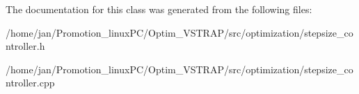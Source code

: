 The documentation for this class was generated from the following files\+:\begin{DoxyCompactItemize}
\item 
/home/jan/\+Promotion\+\_\+linux\+P\+C/\+Optim\+\_\+\+V\+S\+T\+R\+A\+P/src/optimization/stepsize\+\_\+controller.\+h\item 
/home/jan/\+Promotion\+\_\+linux\+P\+C/\+Optim\+\_\+\+V\+S\+T\+R\+A\+P/src/optimization/stepsize\+\_\+controller.\+cpp\end{DoxyCompactItemize}
